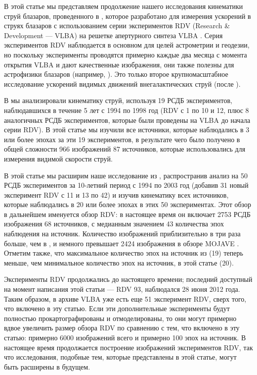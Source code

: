 В этой статье мы представляем продолжение нашего исследования кинематики струй блазаров,
проведенного в \cite{Piner_2007}, которое разработано для измерения ускорений в струях блазаров с
использованием серии экспериментов RDV (Research \& Development --- VLBA) на решетке апертурного
синтеза VLBA \cite{Petrov_2009}. Серия экспериментов RDV наблюдается в основном для целей
астрометрии и геодезии, но поскольку эксперименты проводятся примерно каждые два месяца с момента
открытия VLBA и дают качественные изображения, они также полезны для астрофизики блазаров (например,
\cite{Kovalev_2008,Pushkarev_Kovalev_2012}). Это только второе крупномасштабное исследование
ускорений
видимых движений внегалактических струй (после \cite{Homan_2009}).

В \cite{Piner_2007} мы анализировали кинематику струй, используя 19 РСДБ экспериментов,
наблюдавшихся в течение 5 лет с 1994 по 1998 год (RDV с 1 по 10 и 12, плюс 8 аналогичных РСДБ
экспериментов, которые были проведены на VLBA до начала серии RDV). В этой статье мы изучили
все источники, которые наблюдались в 3 или более эпохах за эти 19 экспериментов, в результате чего
было получено в общей сложности 966 изображений 87 источников, которые использовались для измерения
видимой скорости струй.

В этой статье мы расширим наше исследование из \cite{Piner_2007}, распространив анализ на 50 РСДБ
экспериментов за 10-летний период с 1994 по 2003 год (добавив 31 новый эксперимент RDV с 11 и 13 по
42) и изучив кинематику всех источников, которые наблюдались в 20 или более эпохах в этих 50
экспериментах. Этот обзор в дальнейшем именуется обзор RDV: в настоящее время он включает 2753 РСДБ
изображения 68 источников, с медианным значением 43 количества эпох наблюдения на источник.
Количество изображений приблизительно в три раза больше, чем в \cite{Piner_2007}, и немного
превышает 2424 изображения в обзоре MOJAVE \cite{Lister_2009a}. Отметим также, что максимальное
количество эпох на источник из \cite{Piner_2007} (19) теперь меньше, чем минимальное количество эпох
на источник, в этой статье (20).

Эксперименты RDV продолжались до настоящего времени; последний доступный на момент написания этой
статьи --- RDV 93, наблюдался 28 июня 2012 года. Таким образом, в архиве VLBA уже есть еще 51
эксперимент RDV, сверх того, что включено в эту статью. Если эти дополнительные эксперименты будут
полностью прокартографированы и отмоделированы, то они могут примерно вдвое увеличить размер
обзора RDV по сравнению с тем, что включено в эту статью: примерно 6000 изображений всего и
примерно 100 эпох на источник. В настоящее время продолжается построение изображений экспериментов
RDV, так что исследования, подобные тем, которые представлены в этой статье, могут быть расширены в
будущем.

